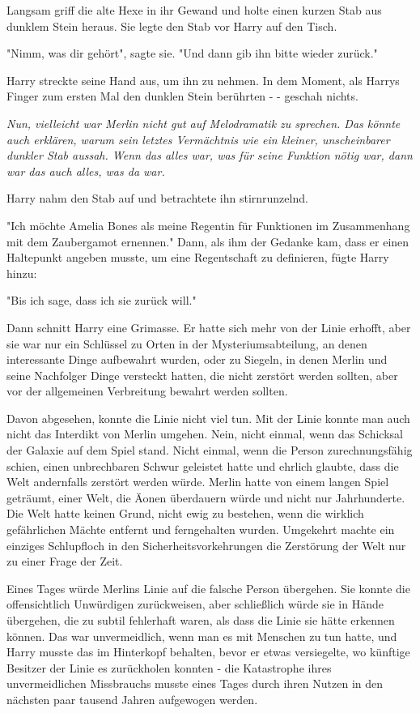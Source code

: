 {Langsam griff die alte Hexe in ihr Gewand und holte einen kurzen Stab aus dunklem Stein heraus. Sie legte den Stab vor Harry auf den Tisch.

"Nimm, was dir gehört", sagte sie. "Und dann gib ihn bitte wieder zurück."

Harry streckte seine Hand aus, um ihn zu nehmen. In dem Moment, als Harrys Finger zum ersten Mal den dunklen Stein berührten - - geschah nichts.

\emph{Nun, vielleicht war Merlin nicht gut auf Melodramatik zu sprechen. Das könnte auch erklären, warum sein letztes Vermächtnis wie ein kleiner, unscheinbarer dunkler Stab aussah. Wenn das alles war, was für seine Funktion nötig war, dann war das auch alles, was da war.}

Harry nahm den Stab auf und betrachtete ihn stirnrunzelnd.

"Ich möchte Amelia Bones als meine Regentin für Funktionen im Zusammenhang mit dem Zaubergamot ernennen." Dann, als ihm der Gedanke kam, dass er einen Haltepunkt angeben musste, um eine Regentschaft zu definieren, fügte Harry hinzu:

"Bis ich sage, dass ich sie zurück will."

Dann schnitt Harry eine Grimasse. Er hatte sich mehr von der Linie erhofft, aber sie war nur ein Schlüssel zu Orten in der Mysteriumsabteilung, an denen interessante Dinge aufbewahrt wurden, oder zu Siegeln, in denen Merlin und seine Nachfolger Dinge versteckt hatten, die nicht zerstört werden sollten, aber vor der allgemeinen Verbreitung bewahrt werden sollten.

Davon abgesehen, konnte die Linie nicht viel tun. Mit der Linie konnte man auch nicht das Interdikt von Merlin umgehen. Nein, nicht einmal, wenn das Schicksal der Galaxie auf dem Spiel stand. Nicht einmal, wenn die Person zurechnungsfähig schien, einen unbrechbaren Schwur geleistet hatte und ehrlich glaubte, dass die Welt andernfalls zerstört werden würde. Merlin hatte von einem langen Spiel geträumt, einer Welt, die Äonen überdauern würde und nicht nur Jahrhunderte. Die Welt hatte keinen Grund, nicht ewig zu bestehen, wenn die wirklich gefährlichen Mächte entfernt und ferngehalten wurden. Umgekehrt machte ein einziges Schlupfloch in den Sicherheitsvorkehrungen die Zerstörung der Welt nur zu einer Frage der Zeit.

Eines Tages würde Merlins Linie auf die falsche Person übergehen. Sie konnte die offensichtlich Unwürdigen zurückweisen, aber schließlich würde sie in Hände übergehen, die zu subtil fehlerhaft waren, als dass die Linie sie hätte erkennen können. Das war unvermeidlich, wenn man es mit Menschen zu tun hatte, und Harry musste das im Hinterkopf behalten, bevor er etwas versiegelte, wo künftige Besitzer der Linie es zurückholen konnten - die Katastrophe ihres unvermeidlichen Missbrauchs musste eines Tages durch ihren Nutzen in den nächsten paar tausend Jahren aufgewogen werden.

}
